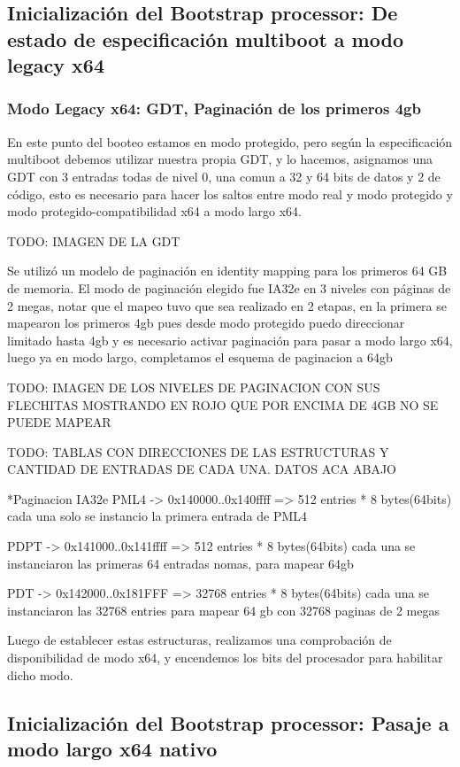 \subsection{Inicialización del Bootstrap processor: De estado de especificación multiboot a modo legacy x64}
    \subsubsection{Modo Legacy x64: GDT, Paginación de los primeros 4gb}
    En este punto del booteo estamos en modo protegido, pero según la especificación multiboot debemos utilizar nuestra propia GDT, y lo hacemos, asignamos una GDT con 
    3 entradas todas de nivel 0, una comun a 32 y 64 bits de datos y 2 de código, esto es necesario para hacer los saltos entre modo real y modo protegido y modo protegido-compatibilidad x64 a modo largo x64.

    TODO: IMAGEN DE LA GDT

    Se utilizó un modelo de paginación en identity mapping para los primeros 64 GB de memoria. El modo de paginación elegido fue IA32e en 3 niveles con páginas de 2 megas, notar que el mapeo tuvo que sea realizado en 2 etapas, en la primera se mapearon los primeros 4gb pues desde modo protegido puedo direccionar limitado hasta 4gb y es necesario activar paginación para pasar a modo largo x64, luego ya en modo largo, completamos el esquema de paginacion a 64gb

    TODO: IMAGEN DE LOS NIVELES DE PAGINACION CON SUS FLECHITAS MOSTRANDO EN ROJO QUE POR ENCIMA DE 4GB NO SE PUEDE MAPEAR

    TODO: TABLAS CON DIRECCIONES DE LAS ESTRUCTURAS Y CANTIDAD DE ENTRADAS DE CADA UNA. DATOS ACA ABAJO

    *Paginacion IA32e PML4 -> 0x140000..0x140ffff => 512 entries * 8 bytes(64bits) cada una solo se instancio la primera entrada de PML4

	PDPT -> 0x141000..0x141ffff => 512 entries * 8 bytes(64bits) cada una se instanciaron las primeras 64 entradas nomas, para mapear 64gb

	PDT -> 0x142000..0x181FFF => 32768 entries * 8 bytes(64bits) cada una se instanciaron las 32768 entries para mapear 64 gb con 32768 paginas de 2 megas

	Luego de establecer estas estructuras, realizamos una comprobación de disponibilidad de modo x64, y encendemos los bits del procesador para habilitar dicho modo.

    \subsection{Inicialización del Bootstrap processor: Pasaje a modo largo x64 nativo}

